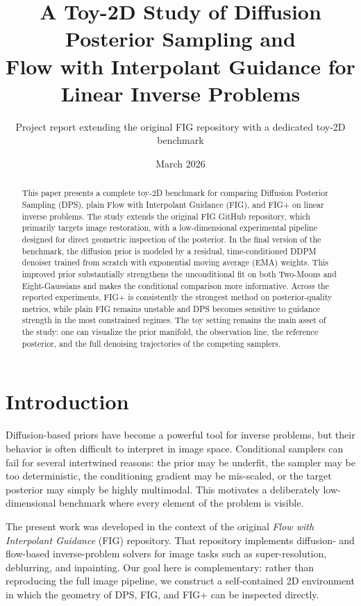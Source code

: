\documentclass[10pt,twocolumn]{article}
\title{\bf A Toy-2D Study of Diffusion Posterior Sampling and\\Flow with Interpolant Guidance for Linear Inverse Problems}
\author{Project report extending the original FIG repository with a dedicated toy-2D benchmark}
\date{March 2026}
\begin{document}
\maketitle

\begin{abstract}
This paper presents a complete toy-2D benchmark for comparing Diffusion Posterior Sampling (DPS), plain Flow with Interpolant Guidance (FIG), and FIG+ on linear inverse problems. The study extends the original FIG GitHub repository, which primarily targets image restoration, with a low-dimensional experimental pipeline designed for direct geometric inspection of the posterior. In the final version of the benchmark, the diffusion prior is modeled by a residual, time-conditioned DDPM denoiser trained from scratch with exponential moving average (EMA) weights. This improved prior substantially strengthens the unconditional fit on both Two-Moons and Eight-Gaussians and makes the conditional comparison more informative. Across the reported experiments, FIG+ is consistently the strongest method on posterior-quality metrics, while plain FIG remains unstable and DPS becomes sensitive to guidance strength in the most constrained regimes. The toy setting remains the main asset of the study: one can visualize the prior manifold, the observation line, the reference posterior, and the full denoising trajectories of the competing samplers.
\end{abstract}

\section{Introduction}

Diffusion-based priors have become a powerful tool for inverse problems, but their behavior is often difficult to interpret in image space. Conditional samplers can fail for several intertwined reasons: the prior may be underfit, the sampler may be too deterministic, the conditioning gradient may be mis-scaled, or the target posterior may simply be highly multimodal. This motivates a deliberately low-dimensional benchmark where every element of the problem is visible.

The present work was developed in the context of the original \textit{Flow with Interpolant Guidance} (FIG) repository. That repository implements diffusion- and flow-based inverse-problem solvers for image tasks such as super-resolution, deblurring, and inpainting. Our goal here is complementary: rather than reproducing the full image pipeline, we construct a self-contained 2D environment in which the geometry of DPS, FIG, and FIG+ can be inspected directly.
\end{document}
